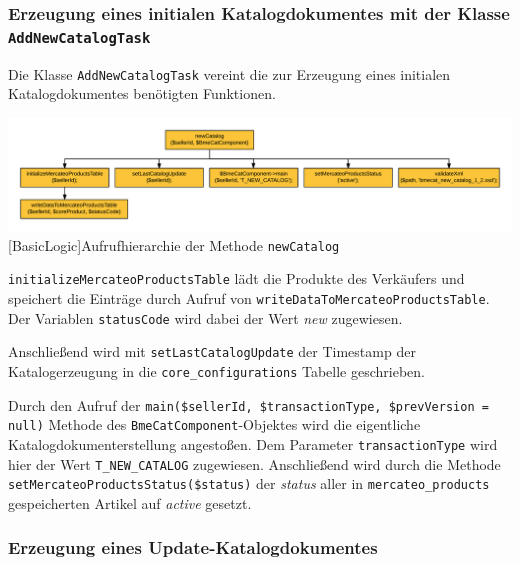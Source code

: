 		
		

	
	\subsubsection{Erzeugung eines initialen Katalogdokumentes mit der Klasse \texttt{AddNewCatalogTask}}
	
	Die Klasse \texttt{AddNewCatalogTask} vereint die zur Erzeugung eines initialen Katalogdokumentes benötigten Funktionen. 
	 
	\begin{minipage}{\linewidth}
		\vspace{1em}
		\centering
		\includegraphics[width=1 \linewidth]{img/newCatalogAufrufhierarchie}
		[BasicLogic]{Aufrufhierarchie der Methode \texttt{newCatalog}}
		\vspace{1em}
	\end{minipage}
	
	\texttt{initializeMercateoProductsTable} lädt die Produkte des Verkäufers und speichert die Einträge durch Aufruf von \texttt{writeDataToMercateoProductsTable}. Der Variablen \texttt{statusCode} wird dabei der Wert \textit{new} zugewiesen. 
	
	Anschließend wird mit \texttt{setLastCatalogUpdate} der Timestamp der Katalogerzeugung in die \texttt{core\_configurations} Tabelle geschrieben.
	
	
	
	Durch den Aufruf der \texttt{main(\$sellerId, \$transactionType, \$prevVersion = null)} Methode des \texttt{BmeCatComponent}-Objektes wird die eigentliche Katalogdokumenterstellung angestoßen. Dem Parameter \texttt{transactionType} wird hier der Wert \texttt{T\_NEW\_CATALOG} zugewiesen. Anschließend wird durch die Methode \texttt{setMercateoProductsStatus(\$status)} der \textit{status} aller in \texttt{mercateo\_products} gespeicherten Artikel auf \textit{active} gesetzt.


	
	
	
	\subsubsection{Erzeugung eines Update-Katalogdokumentes}
	
